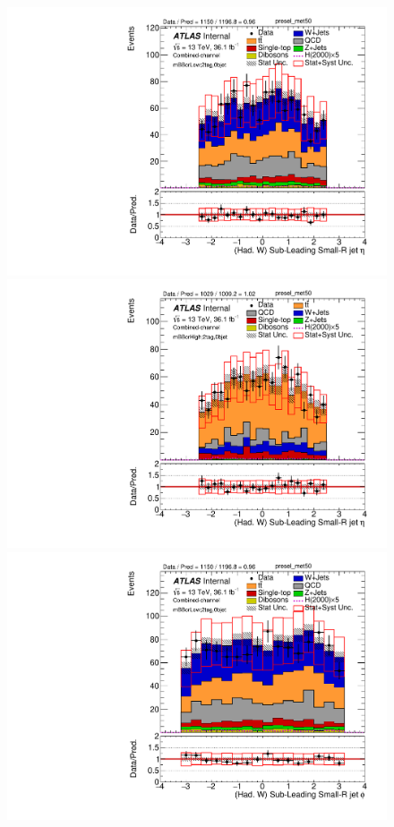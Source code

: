 \begin{figure}[!ht]
\begin{center}
\includegraphics[scale=0.33]{./figures/boosted/PlotByMbbRegions/DataMC_2tag_0bjet_mbbcrLow_lepton_presel_met50_LightJet2Eta}                                                                        
\includegraphics[scale=0.33]{./figures/boosted/PlotByMbbRegions/DataMC_2tag_0bjet_mbbcrHigh_lepton_presel_met50_LightJet2Eta}                                                                       
\includegraphics[scale=0.33]{./figures/boosted/PlotByMbbRegions/DataMC_2tag_0bjet_mbbcrLow_lepton_presel_met50_LightJet2Phi}                                                                        

\end{center}
\end{figure}
